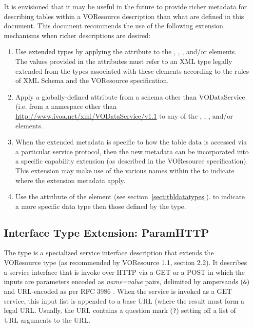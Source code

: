 \documentclass[11pt,a4paper]{ivoa}
\begin{document}
It is envisioned that it may be useful in the future to provide richer
metadata for describing tables within a VOResource description than
what are defined in this document.  This document recommends the
use of the following extension mechanisms when richer descriptions are
desired:

\begin{enumerate}
\item Use extended types by applying the 
       attribute to the ,
       , , 
        and/or
        elements.  The values provided in the
       attributes must refer to an XML type legally extended from the types
       associated with these elements according to the rules of XML Schema
       \citep{std:XSD} and the VOResource specification.

\item Apply a globally-defined attribute from a schema other than
       VODataService (i.e. from a namespace other than
       \url{http://www.ivoa.net/xml/VODataService/v1.1} to any of the
       , ,
       , and/or 
       elements.

\item When the extended metadata is specific to how the table data is
       accessed via a particular service protocol, then the new
       metadata can be incorporated into a specific capability
       extension (as described in the VOResource specification).  
       This extension may make use of the
       various names within the  to
       indicate where the extension metadata apply.

\item Use the  attribute of the
        element (see 
       section~\ref{sect:tbldatatypes}).
       to indicate a more specific data type then those defined by the
        type.
\end{enumerate}

\subsection{Interface Type Extension: ParamHTTP}
\label{sect:paramif}


The  type is a specialized service interface
description that extends the VOResource  type 
(as recommended by VOResource 1.1, section 2.2).  It
describes a service interface that is invoke over HTTP via a GET or a
POST in which the inputs are parameters
encoded as \emph{name=value} pairs, delimited by ampersands
(\verb|&|) and URL-encoded as per RFC 3986 \citep{std:RFC3986}.  When
the service is invoked as a GET service, this input list is appended
to a base URL (where the result must form a legal URL.  Usually, the
URL contains a question mark (\verb|?|) setting off a list of
URL arguments to the URL.
\end{document}
